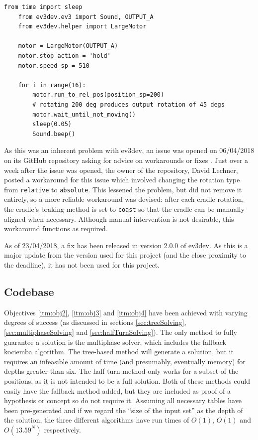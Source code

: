 \documentclass{report}
\newenvironment{aside}{\begin{mdframed}[style=0,%
		leftline=false,rightline=false,leftmargin=2em,rightmargin=2em,%
		innerleftmargin=0pt,innerrightmargin=0pt,linewidth=0.75pt,%
		skipabove=7pt,skipbelow=7pt]\small}
	{\end{mdframed}}
\begin{document}
    \begin{lstlisting}[caption={A short script to test the cradle's accuracy}, label={lst:cradleAccuracyTest}]
    from time import sleep
    from ev3dev.ev3 import Sound, OUTPUT_A
    from ev3dev.helper import LargeMotor
    
    motor = LargeMotor(OUTPUT_A)
    motor.stop_action = 'hold'
    motor.speed_sp = 510
    
    for i in range(16):
	    motor.run_to_rel_pos(position_sp=200)
	    # rotating 200 deg produces output rotation of 45 degs
	    motor.wait_until_not_moving()
	    sleep(0.05)
	    Sound.beep()\end{lstlisting}
    
    As this was an inherent problem with ev3dev, an issue was opened on 06/04/2018 on its GitHub repository asking for advice on workarounds or fixes \cite{Worgarside2018}. Just over a week after the issue was opened, the owner of the repository, David Lechner, posted a workaround for this issue which involved changing the rotation type from \lstinline|relative| to \lstinline|absolute|. This lessened the problem, but did not remove it entirely, so a more reliable workaround was devised: after each cradle rotation, the cradle's braking method is set to \lstinline|coast| so that the cradle can be manually aligned when necessary. Although manual intervention is not desirable, this workaround functions as required.
    
    \begin{aside}
    	As of 23/04/2018, a fix has been released in version 2.0.0 of ev3dev. As this is a major update from the version used for this project (and the close proximity to the deadline), it has not been used for this project.
    \end{aside}
    
    \subsection{Codebase} \label{sec:objectivesCodebase}
    
    Objectives \ref{itm:obj2}, \ref{itm:obj3} and \ref{itm:obj4} have been achieved with varying degrees of success (as discussed in sections \ref{sec:treeSolving}, \ref{sec:multiphaseSolving} and \ref{sec:halfTurnSolving}). The only method to fully guarantee a solution is the multiphase solver, which includes the fallback kociemba algorithm. The tree-based method will generate a solution, but it requires an infeasible amount of time (and presumably, eventually memory) for depths greater than six. The half turn method only works for a subset of the positions, as it is not intended to be a full solution. Both of these methods could easily have the fallback method added, but they are included as proof of a hypothesis or concept so do not require it. Assuming all necessary tables have been pre-generated and if we regard the \enquote{size of the input set} as the depth of the solution, the three different algorithms have run times of $O(1)$, $O(1)$ and $O(13.59^N)$ respectively.
    
\end{document}

